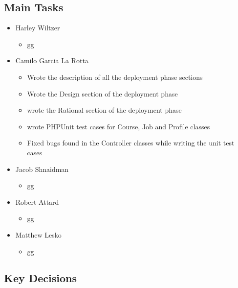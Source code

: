 \documentclass[12pt]{article}
\begin{document}
 \subsection{Main Tasks}


 \begin{itemize}
     \item Harley Wiltzer
 	\begin{itemize}
 		\item gg
 	\end{itemize}
     \item Camilo Garcia La Rotta
     \begin{itemize}
         \item Wrote the description of all the deployment phase sections
         \item Wrote the Design section of the deployment phase
         \item wrote the Rational section of the deployment phase
         \item wrote PHPUnit test cases for Course, Job and Profile classes
         \item Fixed bugs found in the Controller classes while writing the unit test cases
     \end{itemize}
     \item Jacob Shnaidman
 		\begin{itemize}
 			\item gg
 		\end{itemize}
     \item Robert Attard
     \begin{itemize}
         \item gg
     \end{itemize}
     \item Matthew Lesko
     \begin{itemize}
     	\item gg
     \end{itemize}
 \end{itemize}

 \subsection{Key Decisions}

\end{document}
